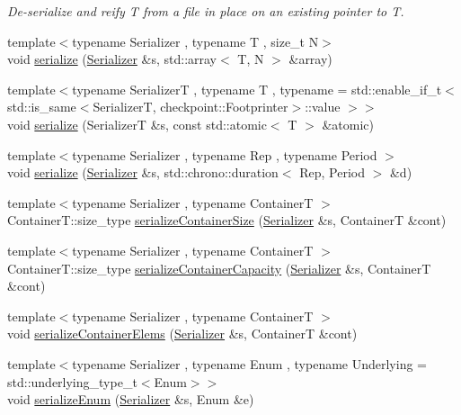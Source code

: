 \begin{DoxyCompactItemize}
\begin{DoxyCompactList}\small\item\em De-\/serialize and reify {\ttfamily T} from a file in place on an existing pointer to {\ttfamily T}. \end{DoxyCompactList}\item 
{\footnotesize template$<$typename Serializer , typename T , size\+\_\+t N$>$ }\\void \hyperlink{namespacecheckpoint_a976e83bf5f22b7bfc5036fd829be039e}{serialize} (\hyperlink{structcheckpoint_1_1_serializer}{Serializer} \&s, std\+::array$<$ T, N $>$ \&array)
\item 
{\footnotesize template$<$typename SerializerT , typename T , typename  = std\+::enable\+\_\+if\+\_\+t$<$    std\+::is\+\_\+same$<$\+Serializer\+T, checkpoint\+::\+Footprinter$>$\+::value  $>$$>$ }\\void \hyperlink{namespacecheckpoint_a40ca9a5c99807bd8a0610098d94b5125}{serialize} (SerializerT \&s, const std\+::atomic$<$ T $>$ \&atomic)
\item 
{\footnotesize template$<$typename Serializer , typename Rep , typename Period $>$ }\\void \hyperlink{namespacecheckpoint_aec244476371c452d9d9318b9d5b24401}{serialize} (\hyperlink{structcheckpoint_1_1_serializer}{Serializer} \&s, std\+::chrono\+::duration$<$ Rep, Period $>$ \&d)
\item 
{\footnotesize template$<$typename Serializer , typename ContainerT $>$ }\\Container\+T\+::size\+\_\+type \hyperlink{namespacecheckpoint_a3359595d5a4c6fcf5fc95069c71f869b}{serialize\+Container\+Size} (\hyperlink{structcheckpoint_1_1_serializer}{Serializer} \&s, ContainerT \&cont)
\item 
{\footnotesize template$<$typename Serializer , typename ContainerT $>$ }\\Container\+T\+::size\+\_\+type \hyperlink{namespacecheckpoint_abb25020fd55429c701342e79205a8d9a}{serialize\+Container\+Capacity} (\hyperlink{structcheckpoint_1_1_serializer}{Serializer} \&s, ContainerT \&cont)
\item 
{\footnotesize template$<$typename Serializer , typename ContainerT $>$ }\\void \hyperlink{namespacecheckpoint_a9c880ba9bb9a106e784e06554b2fbcf2}{serialize\+Container\+Elems} (\hyperlink{structcheckpoint_1_1_serializer}{Serializer} \&s, ContainerT \&cont)
\item 
{\footnotesize template$<$typename Serializer , typename Enum , typename Underlying  = std\+::underlying\+\_\+type\+\_\+t$<$\+Enum$>$$>$ }\\void \hyperlink{namespacecheckpoint_a5f368cb543eec78bb608a68fe2401562}{serialize\+Enum} (\hyperlink{structcheckpoint_1_1_serializer}{Serializer} \&s, Enum \&e)

\end{DoxyCompactItemize}
